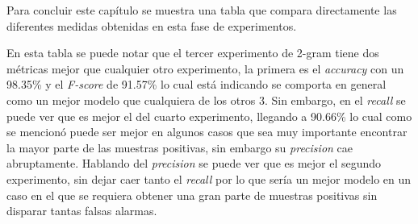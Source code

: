 		 \par Para concluir este capítulo se muestra una tabla que compara directamente las diferentes medidas obtenidas en esta fase de experimentos.
	
		 \begin{center}
		 \begin{table}[H]
\centering
		     
		     		     \label{tab:total}
\end{table}
		 \end{center}
		 
		 \par En esta tabla se puede notar que el tercer experimento de 2-gram tiene dos métricas mejor que cualquier otro experimento, la primera es el \textit{accuracy} con un 98.35\% y el \textit{F-score} de 91.57\% lo cual está indicando se comporta en general como un mejor modelo que cualquiera de los otros 3. Sin embargo, en el \textit{recall} se puede ver que es mejor el del cuarto experimento, llegando a 90.66\% lo cual como se mencionó puede ser mejor en algunos casos que sea muy importante encontrar la mayor parte de las muestras positivas, sin embargo su \textit{precision} cae abruptamente. Hablando del \textit{precision} se puede ver que es mejor el segundo experimento, sin dejar caer tanto el \textit{recall} por lo que sería un mejor modelo en un caso en el que se requiera obtener una gran parte de muestras positivas sin disparar tantas falsas alarmas.
		 
		 